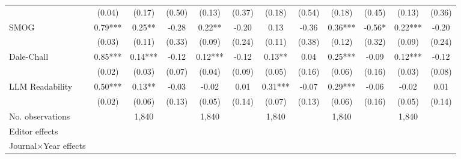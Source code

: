 \begin{table}
\begin{threeparttable}
\begin{tabular}{p{3cm}S@{}S@{}S@{}S@{}S@{}S@{}S@{}S@{}S@{}S@{}S@{}}
                                          &      (0.04)   &      (0.17)   &      (0.50)   &      (0.13)   &      (0.37)   &      (0.18)   &      (0.54)   &      (0.18)   &      (0.45)   &      (0.13)   &      (0.36)   \\
            SMOG                          &        0.79***&        0.25** &       -0.28   &        0.22** &       -0.20   &        0.13   &       -0.36   &        0.36***&       -0.56*  &        0.22***&       -0.20   \\
                                          &      (0.03)   &      (0.11)   &      (0.33)   &      (0.09)   &      (0.24)   &      (0.11)   &      (0.38)   &      (0.12)   &      (0.32)   &      (0.09)   &      (0.24)   \\
            Dale-Chall                    &        0.85***&        0.14***&       -0.12   &        0.12***&       -0.12   &        0.13** &        0.04   &        0.25***&       -0.09   &        0.12***&       -0.12   \\
                                          &      (0.02)   &      (0.03)   &      (0.07)   &      (0.04)   &      (0.09)   &      (0.05)   &      (0.16)   &      (0.06)   &      (0.16)   &      (0.03)   &      (0.08)   \\
            LLM Readability        &        0.50***&        0.13** &       -0.03   &       -0.02   &        0.01   &        0.31***&       -0.07   &        0.29***&       -0.06   &       -0.02   &        0.01   \\
                                          &      (0.02)   &      (0.06)   &      (0.13)   &      (0.05)   &      (0.14)   &      (0.07)   &      (0.13)   &      (0.06)   &      (0.16)   &      (0.05)   &      (0.14)   \\
            \midrule
            No. observations              &               &       1,840   &               &       1,840   &               &       1,840   &               &       1,840   &               &       1,840   &               \\
            \midrule
            Editor effects        &               &           {}   &               &           {}   &               &           {}   &               &           {}   &               &               &               \\
            Journal\(\times\)Year effects          &               &           {}   &               &           {}   &               &           {}   &               &           {}   &               &               &               \\

\end{tabular}
\end{threeparttable}
\end{table}
